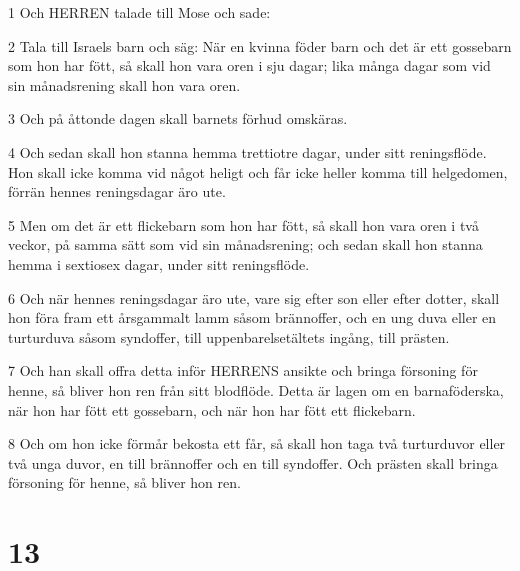 \par 1 Och HERREN talade till Mose och sade:
\par 2 Tala till Israels barn och säg: När en kvinna föder barn och det är ett gossebarn som hon har fött, så skall hon vara oren i sju dagar; lika många dagar som vid sin månadsrening skall hon vara oren.
\par 3 Och på åttonde dagen skall barnets förhud omskäras.
\par 4 Och sedan skall hon stanna hemma trettiotre dagar, under sitt reningsflöde. Hon skall icke komma vid något heligt och får icke heller komma till helgedomen, förrän hennes reningsdagar äro ute.
\par 5 Men om det är ett flickebarn som hon har fött, så skall hon vara oren i två veckor, på samma sätt som vid sin månadsrening; och sedan skall hon stanna hemma i sextiosex dagar, under sitt reningsflöde.
\par 6 Och när hennes reningsdagar äro ute, vare sig efter son eller efter dotter, skall hon föra fram ett årsgammalt lamm såsom brännoffer, och en ung duva eller en turturduva såsom syndoffer, till uppenbarelsetältets ingång, till prästen.
\par 7 Och han skall offra detta inför HERRENS ansikte och bringa försoning för henne, så bliver hon ren från sitt blodflöde. Detta är lagen om en barnaföderska, när hon har fött ett gossebarn, och när hon har fött ett flickebarn.
\par 8 Och om hon icke förmår bekosta ett får, så skall hon taga två turturduvor eller två unga duvor, en till brännoffer och en till syndoffer. Och prästen skall bringa försoning för henne, så bliver hon ren.

\chapter{13}

